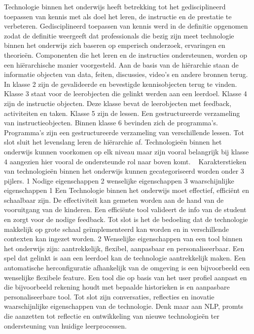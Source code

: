 Technologie binnen het onderwijs heeft betrekking tot het gedisciplineerd toepassen van kennis met als doel het leren, de instructie en de prestatie te verbeteren. 
Gedisciplineerd toepassen van kennis werd in de definitie opgenomen zodat de definitie weergeeft dat professionals die bezig zijn meet technologie binnen het onderwijs zich baseren op emperisch onderzoek, ervaringen en theorieën. 
Componenten die het leren en de instructies ondersteunen, worden op een hiërarchische manier voorgesteld. Aan de basis van de hiërarchie staan de informatie objecten van data, feiten, discussies, video's en andere bronnen terug. In klasse 2 zijn de gevalideerde en bevestigde kennisobjecten terug te vinden. Klasse 3 staat voor de leerobjecten die gelinkt werden aan een leerdoel. Klasse 4 zijn de instructie objecten. Deze klasse bevat de leerobjecten met feedback, activiteiten en taken. Klasse 5 zijn de lessen. Een gestructureerde verzameling van instructieobjecten. Binnen klasse 6 bevinden zich de programma's. Programma's zijn een gestructureerde verzameling van verschillende lessen. Tot slot sluit het levenslang leren de hiërarchie af. 
Technologieën binnen het onderwijs kunnen voorkomen op elk niveau maar zijn vooral belangrijk bij klasse 4 aangezien hier vooral de ondersteunde rol naar boven komt. ~\autocite{Spector2022}
Karakterstieken van technologieën binnen het onderwijs kunnen gecategoriseerd worden onder 3 pijlers. 
1 Nodige eigenschappen
2 wenselijke eigenschappen
3 waarschijnlijke eigenschappen
1 Een Technologie binnen het onderwijs moet effectief, efficiënt en schaalbaar zijn. De effectiviteit kan gemeten worden aan de hand van de vooruitgang van de kinderen. Een efficiënte tool valideert de info van de student en zorgt voor de nodige feedback. Tot slot is het de bedoeling dat de technologie makkelijk op grote schaal geïmplementeerd kan worden en in verschillende contexten kan ingezet worden. 
2 Wenselijke eigenschappen van een tool binnen het onderwijs zijn: aantrekkelijk, flexibel, aanpasbaar en personaliseerbaar. Een spel dat gelinkt is aan een leerdoel kan de technologie aantrekkelijk maken. Een automatische herconfiguratie afhankelijk van de omgeving is een bijvoorbeeld een wenselijke flexibele feature. Een tool die op basis van het user profiel aanpast en die bijvoorbeeld rekening houdt met bepaalde historieken is en aanpasbare personaliseerbare tool. Tot slot zijn conversaties, reflecties en inovatie waarschijnlijke eigenschappen van de technologie. Denk maar aan NLP, promts die aanzetten tot reflectie en ontwikkeling van nieuwe technologieën ter ondersteuning van huidige leerprocessen. ~\autocite{Spector2022}

